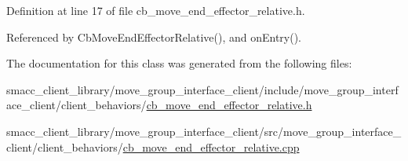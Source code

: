 Definition at line 17 of file cb\+\_\+move\+\_\+end\+\_\+effector\+\_\+relative.\+h.



Referenced by Cb\+Move\+End\+Effector\+Relative(), and on\+Entry().



The documentation for this class was generated from the following files\+:\begin{DoxyCompactItemize}
\item 
smacc\+\_\+client\+\_\+library/move\+\_\+group\+\_\+interface\+\_\+client/include/move\+\_\+group\+\_\+interface\+\_\+client/client\+\_\+behaviors/\hyperlink{cb__move__end__effector__relative_8h}{cb\+\_\+move\+\_\+end\+\_\+effector\+\_\+relative.\+h}\item 
smacc\+\_\+client\+\_\+library/move\+\_\+group\+\_\+interface\+\_\+client/src/move\+\_\+group\+\_\+interface\+\_\+client/client\+\_\+behaviors/\hyperlink{cb__move__end__effector__relative_8cpp}{cb\+\_\+move\+\_\+end\+\_\+effector\+\_\+relative.\+cpp}\end{DoxyCompactItemize}
